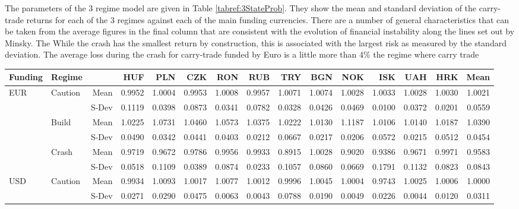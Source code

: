 \documentclass[12pt, a4paper, oneside]{article} %
\begin{document}
The parameters of the 3 regime model are given in Table \ref{tabref:3StateProb}.  They show the mean and standard deviation of the carry-trade returns for each of the 3 regimes against each of the main funding currencies.  There are a number of general characteristics that can be taken from the average figures in the final column that are consistent with the evolution of financial instability along the lines set out by Minsky.  The While the crash has the smallest return by construction, this is associated with the largest risk as measured by the standard deviation. The average loss during the crash for carry-trade funded by Euro is a little more than 4\%  the regime where carry trade 


\begin{landscape}
\begin{table}[ht]
\centering
\begin{tabular}{llrrrrrrrrrrrrr}
  \hline
 Funding&Regime& & HUF & PLN & CZK & RON & RUB & TRY & BGN & NOK & ISK & UAH & HRK & Mean\\ 
 \hline
  \hline
\multirow{6}{*}{EUR}&\multirow{2}{*}{Caution}&Mean & 0.9952 & 1.0004 & 0.9953 & 1.0008 & 0.9957 & 1.0071 & 1.0074 & 1.0028 & 1.0033 & 1.0028 & 1.0030 & 1.0021\\ 
  &&S-Dev & 0.1119 & 0.0398 & 0.0873 & 0.0341 & 0.0782 & 0.0328 & 0.0426 & 0.0469 & 0.0100 & 0.0372 & 0.0201 & 0.0559\\ 
  & \multirow{2}{*}{Build} & Mean & 1.0225 & 1.0731 & 1.0460 & 1.0573 & 1.0375 & 1.0222 & 1.0130 & 1.1187 & 1.0106 & 1.0140 & 1.0187 &1.0390 \\
  && S-Dev & 0.0490 & 0.0342 & 0.0441 & 0.0403 & 0.0212 & 0.0667 & 0.0217 & 0.0206 & 0.0572 & 0.0215 & 0.0512 & 0.0454\\ 
  & \multirow{2}{*}{Crash} & Mean & 0.9719 & 0.9672 & 0.9786 & 0.9956 & 0.9933 & 0.8915 & 1.0028 & 0.9020 & 0.9386 & 0.9671 & 0.9971 & 0.9583\\ 
  && S-Dev & 0.0518 & 0.1109 & 0.0389 & 0.0874 & 0.0233 & 0.1057 & 0.0860 & 0.0669 & 0.1791 & 0.1132 & 0.0823 & 0.0843\\ 
\hline
\multirow{6}{*}{USD}& \multirow{2}{*}{Caution} & Mean   & 0.9934 & 1.0093 & 1.0017 & 1.0077 & 1.0012 & 0.9996 & 1.0045 & 1.0004 & 0.9743 & 1.0025 & 1.0006 & 1.0000\\ 
  && S-Dev & 0.0271 & 0.0290 & 0.0475 & 0.0063 & 0.0043 & 0.0788 & 0.0190 & 0.0049 & 0.0226 & 0.0044 & 0.0120 & 0.0311\\ 

\end{tabular}
\end{table}
\end{landscape}
\end{document}
